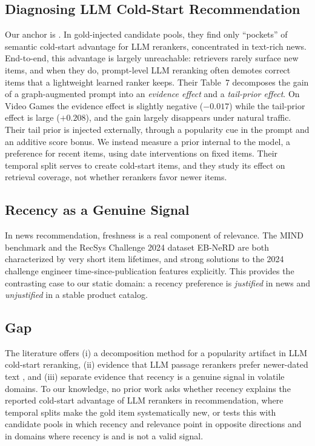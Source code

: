 \documentclass[11pt]{article}
\begin{document}
\subsection{Diagnosing LLM Cold-Start Recommendation}
Our anchor is \citet{dong2026diagnosing}. In gold-injected candidate pools, they find only ``pockets'' of semantic cold-start advantage for LLM rerankers, concentrated in text-rich news. End-to-end, this advantage is largely unreachable: retrievers rarely surface new items, and when they do, prompt-level LLM reranking often demotes correct items that a lightweight learned ranker keeps. Their Table~7 decomposes the gain of a graph-augmented prompt into an \emph{evidence effect} and a \emph{tail-prior effect}. On Video Games the evidence effect is slightly negative ($-0.017$) while the tail-prior effect is large ($+0.208$), and the gain largely disappears under natural traffic. Their tail prior is injected externally, through a popularity cue in the prompt and an additive score bonus. We instead measure a prior internal to the model, a preference for recent items, using date interventions on fixed items. Their temporal split serves to create cold-start items, and they study its effect on retrieval coverage, not whether rerankers favor newer items.

\subsection{Recency as a Genuine Signal}
In news recommendation, freshness is a real component of relevance. The MIND benchmark \citep{wu2020mind} and the RecSys Challenge 2024 dataset EB-NeRD \citep{kruse2024ebnerd} are both characterized by very short item lifetimes, and strong solutions to the 2024 challenge engineer time-since-publication features explicitly. This provides the contrasting case to our static domain: a recency preference is \emph{justified} in news and \emph{unjustified} in a stable product catalog.

\subsection{Gap}
The literature offers (i) a decomposition method for a popularity artifact in LLM cold-start reranking, (ii) evidence that LLM passage rerankers prefer newer-dated text \citep{fang2025recency}, and (iii) separate evidence that recency is a genuine signal in volatile domains. To our knowledge, no prior work asks whether recency explains the reported cold-start advantage of LLM rerankers in recommendation, where temporal splits make the gold item systematically new, or tests this with candidate pools in which recency and relevance point in opposite directions and in domains where recency is and is not a valid signal.
\end{document}
